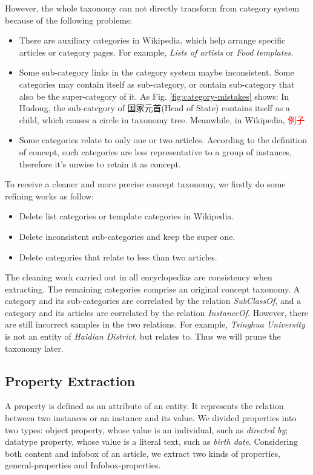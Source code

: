 \documentclass[runningheads,a4paper]{llncs}
\begin{document}
However, the whole taxonomy can not directly transform from category system because of the following problems:
\begin{itemize}
    \item There are auxiliary categories in Wikipedia, which help arrange specific articles or category pages. For example, \emph{Lists of artists} or \emph{Food templates}.
    \item Some sub-category links in the category system maybe inconsistent. Some categories may contain itself as sub-category, or contain sub-category that also be the super-category of it. As Fig. \ref{fig:category-mistakes} shows: In Hudong, the sub-category of 国家元首(Head of State) contains itself as a child, which causes a circle in taxonomy tree. Meanwhile, in Wikipedia, \textcolor{red}{例子}
    \item Some categories relate to only one or two articles. According to the definition of concept, such categories are less representative to a group of instances, therefore it's unwise to retain it as concept.
\end{itemize}
   To receive a cleaner and more precise concept taxonomy, we firstly do some refining works as follow:
\begin{itemize}
    \item Delete list categories or template categories in Wikipedia.
    \item Delete inconsistent sub-categories and keep the super one.
    \item Delete categories that relate to less than two articles.
\end{itemize}
The cleaning work carried out in all encyclopedias are consistency when extracting. The remaining categories comprise an original concept taxonomy. A category and its sub-categories are correlated by the relation \emph{SubClassOf}, and a category and its articles are correlated by the relation \emph{InstanceOf}. However, there are still incorrect samples in the two relations. For example, \emph{Tsinghua University} is not an entity of \emph{Haidian District}, but relates to. Thus we will prune the taxonomy later.

\subsection{Property Extraction}
\label{sec:pe}
A property is defined as an attribute of an entity. It represents the relation between two instances or an instance and its value. We divided properties into two types: object property, whose value is an individual, such as \emph{directed by}; datatype property, whose value is a literal text, such as \emph{birth date}. Considering both content and infobox of an article, we extract two kinds of properties, general-properties and Infobox-properties.
\end{document}
